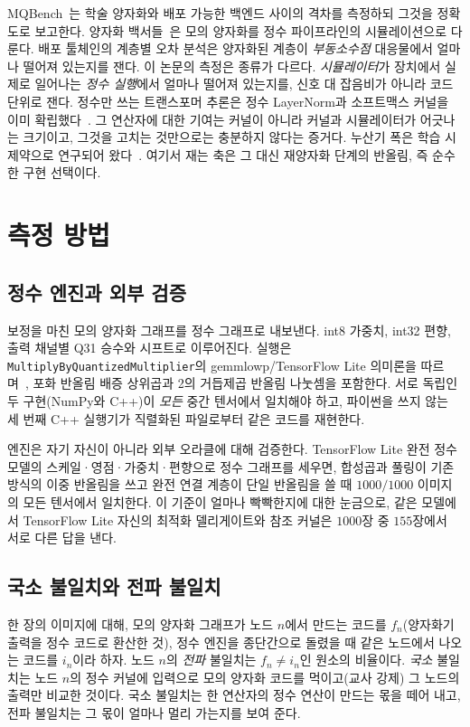 \documentclass[journal]{IEEEtran}
\begin{document}
MQBench~\cite{mqbench}는 학술 양자화와 배포 가능한 백엔드 사이의 격차를 측정하되 그것을 정확도로 보고한다.
양자화 백서들~\cite{nagel2021,krishnamoorthi2018}은 모의 양자화를 정수 파이프라인의 시뮬레이션으로 다룬다.
배포 툴체인의 계층별 오차 분석은 양자화된 계층이 \emph{부동소수점} 대응물에서 얼마나 떨어져 있는지를 잰다.
이 논문의 측정은 종류가 다르다. \emph{시뮬레이터}가 장치에서 실제로 일어나는 \emph{정수 실행}에서 얼마나
떨어져 있는지를, 신호 대 잡음비가 아니라 코드 단위로 잰다. 정수만 쓰는 트랜스포머 추론은 정수 LayerNorm과
소프트맥스 커널을 이미 확립했다~\cite{ibert,fqvit}. 그 연산자에 대한 기여는 커널이 아니라 커널과 시뮬레이터가
어긋나는 크기이고, 그것을 고치는 것만으로는 충분하지 않다는 증거다. 누산기 폭은 학습 시 제약으로 연구되어
왔다~\cite{a2q}. 여기서 재는 축은 그 대신 재양자화 단계의 반올림, 즉 순수한 구현 선택이다.

\section{측정 방법}

\subsection{정수 엔진과 외부 검증}
보정을 마친 모의 양자화 그래프를 정수 그래프로 내보낸다. int8 가중치, int32 편향, 출력 채널별 Q31 승수와
시프트로 이루어진다. 실행은 \texttt{MultiplyByQuantizedMultiplier}의 gemmlowp/TensorFlow Lite 의미론을
따르며~\cite{gemmlowp}, 포화 반올림 배증 상위곱과 2의 거듭제곱 반올림 나눗셈을 포함한다. 서로 독립인 두
구현(NumPy와 C++)이 \emph{모든} 중간 텐서에서 일치해야 하고, 파이썬을 쓰지 않는 세 번째 C++ 실행기가 직렬화된
파일로부터 같은 코드를 재현한다.

엔진은 자기 자신이 아니라 외부 오라클에 대해 검증한다. TensorFlow Lite 완전 정수 모델의 스케일·영점·가중치·편향으로
정수 그래프를 세우면, 합성곱과 풀링이 기존 방식의 이중 반올림을 쓰고 완전 연결 계층이 단일 반올림을 쓸 때
$1000/1000$ 이미지의 모든 텐서에서 일치한다. 이 기준이 얼마나 빡빡한지에 대한 눈금으로, 같은 모델에서
TensorFlow Lite 자신의 최적화 델리게이트와 참조 커널은 $1000$장 중 $155$장에서 서로 다른 답을 낸다.

\subsection{국소 불일치와 전파 불일치}
한 장의 이미지에 대해, 모의 양자화 그래프가 노드 $n$에서 만드는 코드를 $f_n$(양자화기 출력을 정수 코드로 환산한
것), 정수 엔진을 종단간으로 돌렸을 때 같은 노드에서 나오는 코드를 $i_n$이라 하자. 노드 $n$의 \emph{전파}
불일치는 $f_n \neq i_n$인 원소의 비율이다. \emph{국소} 불일치는 노드 $n$의 정수 커널에 입력으로 모의 양자화
코드를 먹이고(교사 강제) 그 노드의 출력만 비교한 것이다. 국소 불일치는 한 연산자의 정수 연산이 만드는 몫을 떼어
내고, 전파 불일치는 그 몫이 얼마나 멀리 가는지를 보여 준다.
\end{document}
